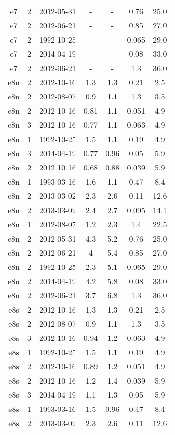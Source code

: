 \begin{table*}[htp]
\begin{tabular}{ccccccc}
e7 & 2 & 2012-05-31 & - & - & 0.76 & 25.0 \\
e7 & 2 & 2012-06-21 & - & - & 0.85 & 27.0 \\
e7 & 2 & 1992-10-25 & - & - & 0.065 & 29.0 \\
e7 & 2 & 2014-04-19 & - & - & 0.08 & 33.0 \\
e7 & 2 & 2012-06-21 & - & - & 1.3 & 36.0 \\
e8n & 2 & 2012-10-16 & 1.3 & 1.3 & 0.21 & 2.5 \\
e8n & 2 & 2012-08-07 & 0.9 & 1.1 & 1.3 & 3.5 \\
e8n & 2 & 2012-10-16 & 0.81 & 1.1 & 0.051 & 4.9 \\
e8n & 3 & 2012-10-16 & 0.77 & 1.1 & 0.063 & 4.9 \\
e8n & 1 & 1992-10-25 & 1.5 & 1.1 & 0.19 & 4.9 \\
e8n & 3 & 2014-04-19 & 0.77 & 0.96 & 0.05 & 5.9 \\
e8n & 2 & 2012-10-16 & 0.68 & 0.88 & 0.039 & 5.9 \\
e8n & 1 & 1993-03-16 & 1.6 & 1.1 & 0.47 & 8.4 \\
e8n & 2 & 2013-03-02 & 2.3 & 2.6 & 0.11 & 12.6 \\
e8n & 2 & 2013-03-02 & 2.4 & 2.7 & 0.095 & 14.1 \\
e8n & 1 & 2012-08-07 & 1.2 & 2.3 & 1.4 & 22.5 \\
e8n & 2 & 2012-05-31 & 4.3 & 5.2 & 0.76 & 25.0 \\
e8n & 2 & 2012-06-21 & 4 & 5.4 & 0.85 & 27.0 \\
e8n & 2 & 1992-10-25 & 2.3 & 5.1 & 0.065 & 29.0 \\
e8n & 2 & 2014-04-19 & 4.2 & 5.8 & 0.08 & 33.0 \\
e8n & 2 & 2012-06-21 & 3.7 & 6.8 & 1.3 & 36.0 \\
e8s & 2 & 2012-10-16 & 1.3 & 1.3 & 0.21 & 2.5 \\
e8s & 2 & 2012-08-07 & 0.9 & 1.1 & 1.3 & 3.5 \\
e8s & 3 & 2012-10-16 & 0.94 & 1.2 & 0.063 & 4.9 \\
e8s & 1 & 1992-10-25 & 1.5 & 1.1 & 0.19 & 4.9 \\
e8s & 2 & 2012-10-16 & 0.89 & 1.2 & 0.051 & 4.9 \\
e8s & 2 & 2012-10-16 & 1.2 & 1.4 & 0.039 & 5.9 \\
e8s & 3 & 2014-04-19 & 1.1 & 1.3 & 0.05 & 5.9 \\
e8s & 1 & 1993-03-16 & 1.5 & 0.96 & 0.47 & 8.4 \\
e8s & 2 & 2013-03-02 & 2.3 & 2.6 & 0.11 & 12.6 \\

\end{tabular}
\end{table*}
